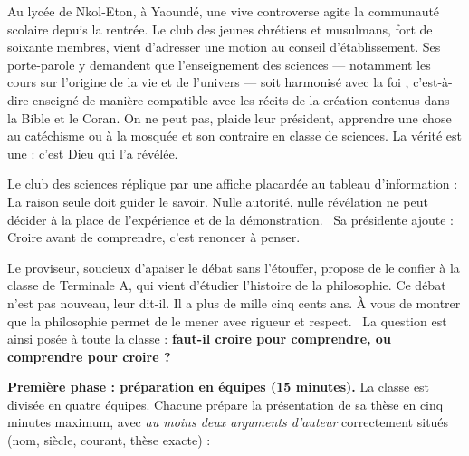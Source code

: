 \documentclass[11pt]{article}
\newcounter{popsec}
\newcounter{popsub}
\newcommand{\courssub}[1]{%
  \stepcounter{popsub}%
  \par\vspace{9pt}\noindent{\popxbold\fontsize{11.5}{13}\selectfont\color{popink}{\color{poporange}\thepopsec.\thepopsub}\hspace{6pt}#1}\par\nopagebreak\vspace{4pt}
}
\begin{document}
\begin{exemplebox}
Au lycée de Nkol-Eton, à Yaoundé, une vive controverse agite la communauté scolaire depuis la rentrée. Le club des jeunes chrétiens et musulmans, fort de soixante membres, vient d'adresser une motion au conseil d'établissement. Ses porte-parole y demandent que l'enseignement des sciences — notamment les cours sur l'origine de la vie et de l'univers — soit \guillemotleft harmonisé avec la foi \guillemotright, c'est-à-dire enseigné de manière compatible avec les récits de la création contenus dans la Bible et le Coran. \guillemotleft On ne peut pas, plaide leur président, apprendre une chose au catéchisme ou à la mosquée et son contraire en classe de sciences. La vérité est une : c'est Dieu qui l'a révélée. \guillemotright

Le club des sciences réplique par une affiche placardée au tableau d'information : \guillemotleft La raison seule doit guider le savoir. Nulle autorité, nulle révélation ne peut décider à la place de l'expérience et de la démonstration. \guillemotright\ Sa présidente ajoute : \guillemotleft Croire avant de comprendre, c'est renoncer à penser. \guillemotright

Le proviseur, soucieux d'apaiser le débat sans l'étouffer, propose de le confier à la classe de Terminale A, qui vient d'étudier l'histoire de la philosophie. \guillemotleft Ce débat n'est pas nouveau, leur dit-il. Il a plus de mille cinq cents ans. À vous de montrer que la philosophie permet de le mener avec rigueur et respect. \guillemotright\ La question est ainsi posée à toute la classe : \textbf{faut-il croire pour comprendre, ou comprendre pour croire ?}
\end{exemplebox}

\courssub{Consignes}

\textbf{Première phase : préparation en équipes (15 minutes).} La classe est divisée en quatre équipes. Chacune prépare la présentation de sa thèse en cinq minutes maximum, avec \emph{au moins deux arguments d'auteur} correctement situés (nom, siècle, courant, thèse exacte) :
\end{document}
